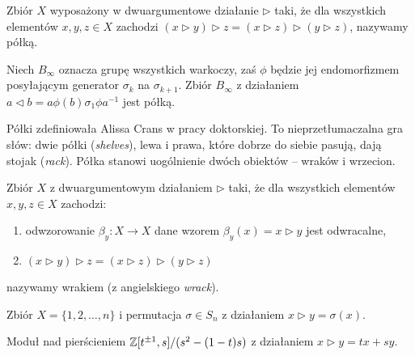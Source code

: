 \begin{definition}[półka]
    Zbiór $X$ wyposażony w dwuargumentowe działanie $\triangleright$ taki, że dla wszystkich elementów $x, y, z \in X$ zachodzi $(x \triangleright y) \triangleright z = (x \triangleright z) \triangleright (y \triangleright z)$, nazywamy półką.
\end{definition}

\begin{example}
    Niech $B_\infty$ oznacza grupę wszystkich warkoczy, zaś $\phi$ będzie jej endomorfizmem posyłającym generator $\sigma_k$ na $\sigma_{k+1}$.
    Zbiór $B_\infty$ z działaniem $a \triangleleft b = a\phi(b)\sigma_1 \phi{a} ^{-1}$ jest półką.
\end{example}

Półki zdefiniowała Alissa Crans w pracy doktorskiej.
To nieprzetłumaczalna gra słów: dwie półki (\emph{shelves}), lewa i prawa, które dobrze do siebie pasują, dają stojak (\emph{rack}).
Półka stanowi uogólnienie dwóch obiektów -- wraków i wrzecion.

\begin{definition}[wrak]
    Zbiór $X$ z dwuargumentowym działaniem $\triangleright$ taki, że dla wszystkich elementów $x, y, z \in X$ zachodzi:
    \begin{enumerate}
        \item odwzorowanie $\beta_y \colon X \to X$ dane wzorem $\beta_y(x) = x \triangleright y$ jest odwracalne,
        \item $(x \triangleright y) \triangleright z = (x \triangleright z) \triangleright (y \triangleright z)$
    \end{enumerate}
    nazywamy wrakiem (z angielskiego \emph{wrack}).
\end{definition}

\begin{example}
    Zbiór $X = \{1, 2, \ldots, n\}$ i permutacja $\sigma \in S_n$ z działaniem $x \triangleright y = \sigma(x)$.
\end{example}

\begin{example}
    Moduł nad pierścieniem $\mathbb Z[t^{\pm 1}, s]/(s^2 - (1-t)s)$ z działaniem $x \triangleright y = tx+sy$.
\end{example}

